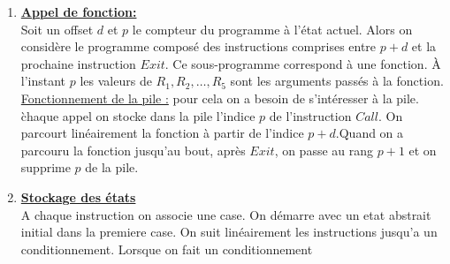 \documentclass[a4paper,french, 12pt]{article}
\begin{document}
\begin{enumerate}
\begin{enumerate}
		\end{enumerate}
		\item \textbf{\underline{Appel de fonction:}}\\
		Soit un offset $d$ et $p$ le compteur du programme à l'état actuel. Alors on considère le programme composé des instructions comprises entre $p+d$ et la prochaine instruction $Exit$.
		 Ce sous-programme correspond à une fonction. \`A l'instant $p$ les valeurs de $R_1,R_2,\dots,R_5$ sont les arguments passés à la fonction.\\
		\underline{Fonctionnement de la pile :} pour cela on a besoin de s'intéresser à la pile. \` chaque appel on stocke dans la pile l'indice $p$ de l'instruction $Call$.
		 On parcourt linéairement la fonction à partir de l'indice $p+d$.Quand on a parcouru la fonction jusqu'au bout, après $Exit$, on passe au rang $p+1$ et on supprime $p$ de la pile.
		\item \textbf{\underline{Stockage des états}}\\
		A chaque instruction on associe une case. On démarre avec un etat abstrait initial dans la premiere case. On suit linéairement les instructions jusqu'a un conditionnement. Lorsque on fait un conditionnement 
		\begin{center}
\end{center}
\end{enumerate}
\end{document}
